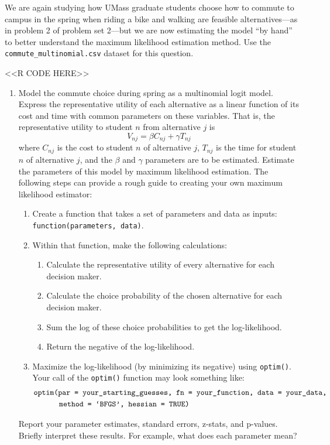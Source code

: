 \documentclass[11pt,letterpaper]{article}
\begin{document}
We are again studying how UMass graduate students choose how to commute to campus in the spring when riding a bike and walking are feasible alternatives---as in problem 2 of problem set 2---but we are now estimating the model ``by hand'' to better understand the maximum likelihood estimation method. Use the \texttt{commute\_multinomial.csv} dataset for this question.

<<R CODE HERE>>

\begin{enumerate}[label=\alph*., leftmargin=*]
	\item Model the commute choice during spring as a multinomial logit model. Express the representative utility of each alternative as a linear function of its cost and time with common parameters on these variables. That is, the representative utility to student $n$ from alternative $j$ is
	$$V_{nj} = \beta C_{nj} + \gamma T_{nj}$$
	where $C_{nj}$ is the cost to student $n$ of alternative $j$, $T_{nj}$ is the time for student $n$ of alternative $j$, and the $\beta$ and $\gamma$ parameters are to be estimated. Estimate the parameters of this model by maximum likelihood estimation. The following steps can provide a rough guide to creating your own maximum likelihood estimator:
	\begin{enumerate}[label=\Roman*.]
		\item Create a function that takes a set of parameters and data as inputs: \texttt{function(parameters, data)}.
		\item Within that function, make the following calculations:
		\begin{enumerate}[label=\roman*.]
			\item Calculate the representative utility of every alternative for each decision maker.
			\item Calculate the choice probability of the chosen alternative for each decision maker.
			\item Sum the log of these choice probabilities to get the log-likelihood.
			\item Return the negative of the log-likelihood.
		\end{enumerate}
		\item Maximize the log-likelihood (by minimizing its negative) using \texttt{optim()}. Your call of the \texttt{optim()} function may look something like:
		\begin{align*}
			&\text{\texttt{optim(par = your\_starting\_guesses, fn = your\_function, data = your\_data,}} \\
			& \qquad \quad \; \text{\texttt{method = `BFGS', hessian = TRUE)}}
		\end{align*}
	\end{enumerate}
	Report your parameter estimates, standard errors, z-stats, and p-values. Briefly interpret these results. For example, what does each parameter mean?


\end{enumerate}
\end{document}
